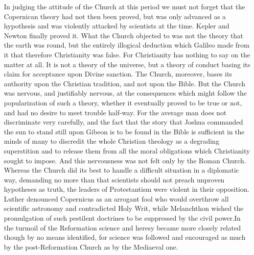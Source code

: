 \documentclass{book}
\begin{document}
In judging the attitude of the Church at this period we must not forget that the Copernican theory had not then been proved, but was only advanced as a hypothesis and was violently attacked by scientists at the time. Kepler and Newton finally proved it. What the Church objected to was not the theory that the earth was round, but the entirely illogical deduction which Galileo made from it that therefore Christianity was false. For Christianity has nothing to say on the matter at all. It is not a theory of the universe, but a theory of conduct basing its claim for acceptance upon Divine sanction. The Church, moreover, bases its authority upon the Christian tradition, and not upon the Bible. But the Church was nervous, and justifiably nervous, at the consequences which might follow the popularization of such a theory, whether it eventually proved to be true or not, and had no desire to meet trouble half-way. For the average man does not discriminate very carefully, and the fact that the story that Joshua commanded the sun to stand still upon Gibeon is to be found in the Bible is sufficient in the minds of many to discredit the whole Christian theology as a degrading superstition and to release them from all the moral obligations which Christianity sought to impose. And this nervousness was not felt only by the Roman Church. Whereas the Church did its best to handle a difficult situation in a diplomatic way, demanding no more than that scientists should not preach unproven hypotheses as truth, the leaders of Protestantism were violent in their opposition. Luther denounced Copernicus as an arrogant fool who would overthrow all scientific astronomy and contradicted Holy Writ, while Melanchthon wished the promulgation of such pestilent doctrines to be suppressed by the civil power.\footnotemark[9] In the turmoil of the Reformation science and heresy became more closely related though by no means identified, for science was followed and encouraged as much by the post-Reformation Church as by the Mediaeval one.
\end{document}
